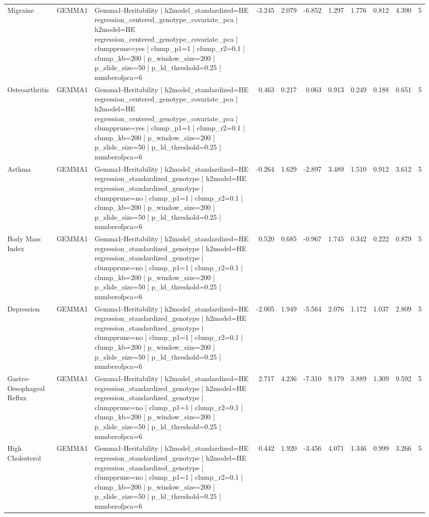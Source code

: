 \begin{landscape}
\begin{longtable}{p{2.4cm}p{1.8cm}p{6.0cm}rrrrrrrr}
Migraine & GEMMA1 & Gemma1-Heritability | h2model\_standardized=HE regression\_centered\_genotype\_covariate\_pca | h2model=HE regression\_centered\_genotype\_covariate\_pca | clumpprune=yes | clump\_p1=1 | clump\_r2=0.1 | clump\_kb=200 | p\_window\_size=200 | p\_slide\_size=50 | p\_ld\_threshold=0.25 | numberofpca=6 & -3.245 & 2.079 & -6.852 & 1.297 & 1.776 & 0.812 & 4.390 & 5 \\
Osteoarthritis & GEMMA1 & Gemma1-Heritability | h2model\_standardized=HE regression\_centered\_genotype\_covariate\_pca | h2model=HE regression\_centered\_genotype\_covariate\_pca | clumpprune=yes | clump\_p1=1 | clump\_r2=0.1 | clump\_kb=200 | p\_window\_size=200 | p\_slide\_size=50 | p\_ld\_threshold=0.25 | numberofpca=6 & 0.463 & 0.217 & 0.063 & 0.913 & 0.249 & 0.188 & 0.651 & 5 \\
Asthma & GEMMA1 & Gemma1-Heritability | h2model\_standardized=HE regression\_standardized\_genotype | h2model=HE regression\_standardized\_genotype | clumpprune=no | clump\_p1=1 | clump\_r2=0.1 | clump\_kb=200 | p\_window\_size=200 | p\_slide\_size=50 | p\_ld\_threshold=0.25 | numberofpca=6 & -0.264 & 1.629 & -2.897 & 3.489 & 1.510 & 0.912 & 3.612 & 5 \\
Body Mass Index & GEMMA1 & Gemma1-Heritability | h2model\_standardized=HE regression\_standardized\_genotype | h2model=HE regression\_standardized\_genotype | clumpprune=no | clump\_p1=1 | clump\_r2=0.1 | clump\_kb=200 | p\_window\_size=200 | p\_slide\_size=50 | p\_ld\_threshold=0.25 | numberofpca=6 & 0.520 & 0.685 & -0.967 & 1.745 & 0.342 & 0.222 & 0.879 & 5 \\
Depression & GEMMA1 & Gemma1-Heritability | h2model\_standardized=HE regression\_standardized\_genotype | h2model=HE regression\_standardized\_genotype | clumpprune=no | clump\_p1=1 | clump\_r2=0.1 | clump\_kb=200 | p\_window\_size=200 | p\_slide\_size=50 | p\_ld\_threshold=0.25 | numberofpca=6 & -2.005 & 1.949 & -5.564 & 2.076 & 1.172 & 1.037 & 2.809 & 5 \\
Gastro-Oesophageal Reflux & GEMMA1 & Gemma1-Heritability | h2model\_standardized=HE regression\_standardized\_genotype | h2model=HE regression\_standardized\_genotype | clumpprune=no | clump\_p1=1 | clump\_r2=0.1 | clump\_kb=200 | p\_window\_size=200 | p\_slide\_size=50 | p\_ld\_threshold=0.25 | numberofpca=6 & 2.717 & 4.236 & -7.310 & 9.179 & 3.889 & 1.309 & 9.592 & 5 \\
High Cholesterol & GEMMA1 & Gemma1-Heritability | h2model\_standardized=HE regression\_standardized\_genotype | h2model=HE regression\_standardized\_genotype | clumpprune=no | clump\_p1=1 | clump\_r2=0.1 | clump\_kb=200 | p\_window\_size=200 | p\_slide\_size=50 | p\_ld\_threshold=0.25 | numberofpca=6 & 0.442 & 1.920 & -3.456 & 4.071 & 1.346 & 0.999 & 3.266 & 5 \\

\end{longtable}
\end{landscape}
